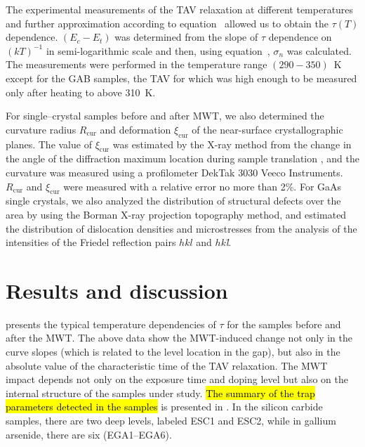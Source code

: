 \documentclass[10pt]{iopart}
\begin{document}
The experimental measurements of the TAV relaxation at different temperatures and further approximation according
to equation~
allowed us to obtain the $\tau(T)$ dependence.
$(E_c-E_t)$ was determined from the slope of $\tau$ dependence on $(kT)^{-1}$ in semi-logarithmic scale
and then, using equation~, $\sigma_n$ was calculated.
The measurements were performed in the temperature range $(290-350)$~K except for the GAB samples,
the TAV for which was high enough to be measured only after heating to above 310~K.

For single--crystal samples  before and after MWT, we also determined the curvature radius $R_\mathrm{cur}$
and deformation $\xi_\mathrm{cur}$ of the near-surface crystallographic planes.
The value of  $\xi_\mathrm{cur}$ was estimated by the X-ray method from the change in the angle of the diffraction
maximum location  during sample translation \cite{Godwod},
and the curvature was measured using a profilometer DekTak 3030 Veeco Instruments.
$R_\mathrm{cur}$ and $\xi_\mathrm{cur}$ were measured with a relative error no more than 2\%.
For GaAs single crystals, we also analyzed the distribution of structural defects
over the area by using the Borman X-ray projection topography method,
and estimated the distribution of dislocation  densities and microstresses from the
analysis of the intensities of the Friedel reflection pairs $hkl$ and $hk$\emph{\={l}}.

\section{Results and discussion}\label{sec:Rez}


 presents the typical temperature dependencies of $\tau$ for the samples before and after the MWT.
The above data show the MWT-induced change not only in the curve slopes (which is related to the level location in the gap),
but also in the absolute value of the characteristic time of the TAV relaxation.
The MWT impact depends not only on the exposure time and doping level but also on the internal structure of the samples under study.
\hl{The summary of the trap parameters detected in the samples} is presented in .
In the silicon carbide samples, there are two deep levels, labeled ESC1 and ESC2, while in gallium arsenide, there are six (EGA1–EGA6).
\end{document}
